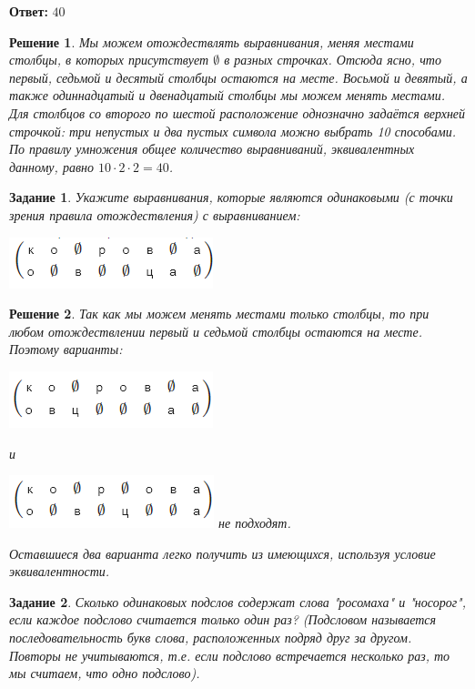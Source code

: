\documentclass[a4paper,oneside]{memoir}
\newtheorem{task}{Задание}
\newtheorem{solution}{Решение}
\begin{document}
\textbf{Ответ:} $ 40 $

\begin{solution}
	Мы можем отождествлять выравнивания, меняя местами столбцы, в которых присутствует $ \emptyset $ в разных строчках. Отсюда ясно, что первый, седьмой и десятый столбцы остаются на месте. Восьмой и девятый, а также одиннадцатый и двенадцатый столбцы мы можем менять местами. Для столбцов со второго по шестой расположение однозначно задаётся верхней строчкой: три непустых и два пустых символа можно выбрать 10 способами. По правилу умножения общее количество выравниваний, эквивалентных данному, равно $  10 \cdot 2 \cdot 2 = 40 $.
\end{solution}

\hrulefill

\begin{task}
	Укажите выравнивания, которые являются одинаковыми (с точки зрения правила отождествления) с выравниванием:
	
		\includegraphics{src/task5}
		
\end{task}

\begin{solution}
	Так как мы можем менять местами только столбцы, то при любом отождествлении первый и седьмой столбцы остаются на месте. Поэтому варианты:
	
			\includegraphics{src/wrong5_1}
			
			и
			
			\includegraphics{src/wrong5_2} не подходят.
	
	Оставшиеся два варианта легко получить из имеющихся, используя условие эквивалентности.
	
\end{solution}

\hrulefill

\begin{task}
	Сколько одинаковых подслов содержат слова "росомаха" и "носорог", если каждое подслово считается только один раз? (Подсловом называется последовательность букв слова, расположенных подряд друг за другом. Повторы не учитываются, т.е. если подслово встречается несколько раз, то мы считаем, что одно подслово).
\end{task}
\end{document}
